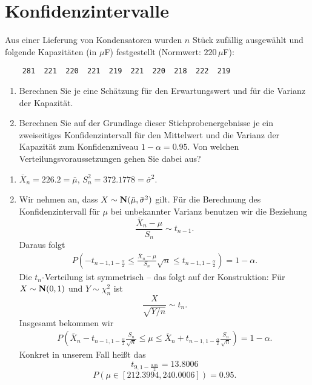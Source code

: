 \section{Konfidenzintervalle}

 Aus einer Lieferung von
Kondensatoren wurden $n$ Stück zufällig ausgewählt und folgende Kapazitäten (in
$\mu$F) festgestellt (Normwert: $220\,\mu$F):
\begin{lstlisting}
    281  221  220  221  219  221  220  218  222  219
\end{lstlisting}
\begin{enumerate}
    \item Berechnen Sie je eine Schätzung für den Erwartungswert und für die
        Varianz der Kapazität. 
    \item Berechnen Sie auf der Grundlage dieser Stichprobenergebnisse je ein
        zweiseitiges Konfidenzintervall für den Mittelwert und die Varianz der
        Kapazität zum Konfidenzniveau $1-\alpha = 0.95$. Von welchen
        Verteilungsvoraussetzungen gehen Sie dabei aus?
\end{enumerate}

\solution
\begin{enumerate}
    \item $\bar X_n = 226.2 = \bar \mu$, $S^2_n = 372.1778 = \bar \sigma^2$.
    \item Wir nehmen an, dass $X \sim \mathbf N(\bar \mu, \bar \sigma^2)$ gilt. 
        Für die Berechnung des Konfidenzintervall für $\mu$ bei unbekannter Varianz
        benutzen wir die Beziehung
        \begin{equation*}
            \frac{\bar X_n - \mu}{ S_n} \sim t_{n-1}. 
        \end{equation*}
        Daraus folgt
        \begin{align*}
            P\left( - t_{n-1, 1-\frac{\alpha}{2}} \leq 
            \frac{\bar X_n - \mu}{ S_n}\sqrt{n}
            \leq t_{n-1, 1-\frac{\alpha}{2}} \right) = 1-\alpha. 
        \end{align*}
        Die $t_{n}$-Verteilung ist symmetrisch -- das folgt auf der Konstruktion: Für 
        $X\sim \mathbf N(0,1)$ und $Y\sim \chi^{2}_{n}$ ist 
        \begin{equation*}
            \frac{X}{\sqrt{Y/n}} \sim t_{n}. 
        \end{equation*}
        Insgesamt bekommen wir
        \begin{align*}
            P\left( \bar X_n - t_{n-1, 1-\frac{\alpha}{2}} \frac{S_{n}}{\sqrt{n}} 
            \leq \mu \leq \bar X_{n} + t_{n-1, 1-\frac{\alpha}{2}} \frac{S_{n}}{\sqrt{n}}
            \right) = 1-\alpha. 
        \end{align*}
        Konkret in unserem Fall heißt das
        \begin{equation*}
            t_{9, 1-\frac{0.05}{2}} = 13.8006
        \end{equation*}
        \begin{equation*}
            P\left( \mu \in \left[ 212.3994 , 240.0006 \right] \right) = 0.95.
        \end{equation*}
\end{enumerate}

